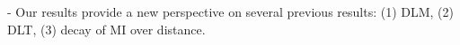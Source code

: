 \documentclass[11pt,letterpaper]{article}
\begin{document}
- Our results provide a new perspective on several previous results: (1) DLM, (2) DLT, (3) decay of MI over distance.


%
%
%
%
%
\end{document}
